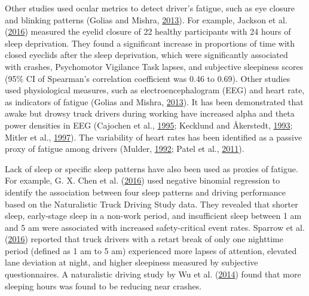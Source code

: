 \documentclass[12pt]{book}
\numberwithin{equation}{chapter}
\begin{document}
Other studies used ocular metrics to detect driver's fatigue, such as eye closure and blinking patterns (Golias and Mishra, \protect\hyperlink{ref-golias2013evaluating}{2013}). For example, Jackson et al. (\protect\hyperlink{ref-jackson2016utility}{2016}) measured the eyelid closure of 22 healthy participants with 24 hours of sleep deprivation. They found a significant increase in proportions of time with closed eyeclids after the sleep deprivation, which were significantly associated with crashes, Psychomotor Vigilance Task lapses, and subjective sleepiness scores (95\% CI of Spearman's correlation coefficient was 0.46 to 0.69). Other studies used physiological measures, such as electroencephalogram (EEG) and heart rate, as indicators of fatigue (Golias and Mishra, \protect\hyperlink{ref-golias2013evaluating}{2013}). It has been demonstrated that awake but drowsy truck drivers during working have increased alpha and theta power densities in EEG (Cajochen et al., \protect\hyperlink{ref-cajochen1995power}{1995}; Kecklund and Åkerstedt, \protect\hyperlink{ref-kecklund1993sleepiness}{1993}; Mitler et al., \protect\hyperlink{ref-mitler1997sleep}{1997}). The variability of heart rates has been identified as a passive proxy of fatigue among drivers (Mulder, \protect\hyperlink{ref-mulder1992measurement}{1992}; Patel et al., \protect\hyperlink{ref-patel2011applying}{2011}).

Lack of sleep or specific sleep patterns have also been used as proxies of fatigue. For example, G. X. Chen et al. (\protect\hyperlink{ref-chen2016influence}{2016}) used negative binomial regression to identify the association between four sleep patterns and driving performance based on the Naturalistic Truck Driving Study data. They revealed that shorter sleep, early-stage sleep in a non-work period, and insufficient sleep between 1 am and 5 am were associated with increased safety-critical event rates. Sparrow et al. (\protect\hyperlink{ref-sparrow2016naturalistic}{2016}) reported that truck drivers with a retart break of only one nighttime period (defined as 1 am to 5 am) experienced more lapses of attention, elevated lane deviation at night, and higher sleepiness measured by subjective questionnaires. A naturalistic driving study by Wu et al. (\protect\hyperlink{ref-wu2014using}{2014}) found that more sleeping hours was found to be reducing near crashes.
\end{document}
